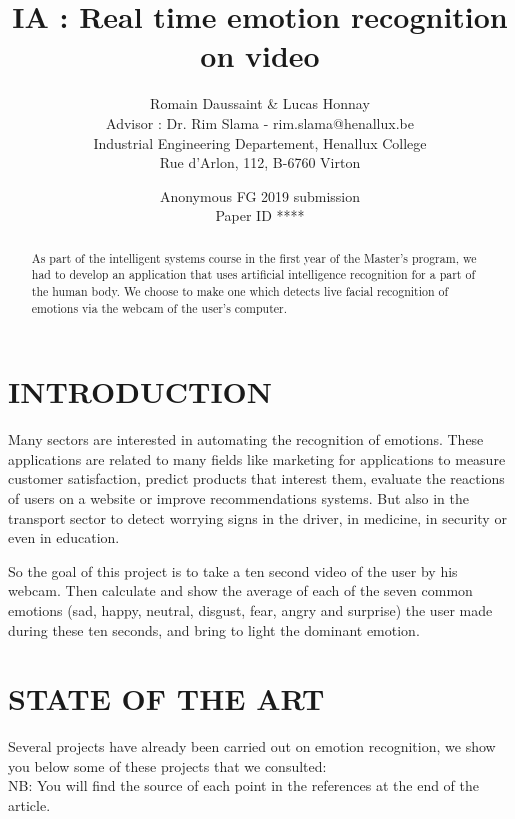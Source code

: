 \documentclass[a4paper, 10pt, conference]{ieeeconf}      %
\title{\LARGE \bf IA : Real time emotion recognition on video }
\author{\parbox{16cm}{\centering
    {\large Romain Daussaint \& Lucas Honnay}\\
    {\large Advisor : Dr. Rim Slama - rim.slama@henallux.be}\\
    {\normalsize
    Industrial Engineering Departement, Henallux College\\
	Rue d’Arlon, 112,  B-6760 Virton
    }}}
\def\FGPaperID{****} %
\begin{document}
\ifFGfinal
\thispagestyle{empty}
\pagestyle{empty}
\else
\author{Anonymous FG 2019 submission\\ Paper ID \FGPaperID \\}
\pagestyle{plain}
\fi
\maketitle


\begin{abstract}

As part of the intelligent systems course in the first year of the Master's program, we had to develop an application that uses artificial intelligence recognition for a part of the human body.
We choose to make one which detects live facial recognition of emotions via the webcam of the user's computer.

\end{abstract}


\section{INTRODUCTION}

Many sectors are interested in automating the recognition of emotions.
These applications are related to many fields like marketing for applications to measure customer satisfaction, predict products that interest them, evaluate the reactions of users on a website or improve recommendations systems.
But also in the transport sector to detect worrying signs in the driver, in medicine, in security or even in education.\

So the goal of this project is to take a ten second video of the user by his webcam.
Then calculate and show the average of each of the seven common emotions (sad, happy, neutral, disgust, fear, angry and surprise) the user made during these ten seconds, and bring to light the dominant emotion.


\section{STATE OF THE ART}
Several projects have already been carried out on emotion recognition, we show you below some of these projects that we consulted:\\
\scriptsize NB: You will find the source of each point in the references at the end of the article.\\
	
\end{document}
